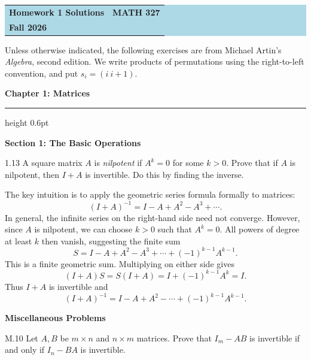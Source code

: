 \documentclass[11pt]{article}
\newcommand{\chapterheading}[1]{%
  \par\vspace{0.5em}
  {\color{courseblue}\Large\bfseries #1}\par\vspace{0.35em}
  {\color{boxborder}\hrule height 0.6pt}\vspace{0.35em}
}
\newcommand{\sectionheading}[1]{%
  \vspace{0.25em}
  {\color{darkgray}\large\bfseries #1}\par
}
\begin{document}
\begin{center}
  \colorbox{lightblue}{%
    \begin{minipage}{0.92\textwidth}
      \vspace{0.6em}
      \begin{tabular*}{\textwidth}{@{\extracolsep{\fill}}lr}
        {\color{courseblue}\bfseries\LARGE Homework 1 Solutions} &
        {\color{courseblue}\bfseries\LARGE MATH 327}\\[0.4em]
        \multicolumn{2}{l}{\color{darkgray}\bfseries Fall 2026}
      \end{tabular*}
      \vspace{0.5em}
    \end{minipage}}
\end{center}

\vspace{0.5em}

Unless otherwise indicated, the following exercises are from Michael Artin's
\emph{Algebra}, second edition.  We write products of permutations using the
right-to-left convention, and put $s_i=(i\ i+1)$.

\chapterheading{Chapter 1: Matrices}

\sectionheading{Section 1: The Basic Operations}

\begin{exercise}{1.13}
A square matrix $A$ is \emph{nilpotent} if $A^k=0$ for some $k>0$.
Prove that if $A$ is nilpotent, then $I+A$ is invertible. Do this by
finding the inverse.
\end{exercise}

\begin{solution}

The key intuition is to apply the geometric series formula formally to matrices:
\[
  (I+A)^{-1}=I-A+A^2-A^3+\cdots.
\]
In general, the infinite series on the right-hand side need not converge.
However, since $A$ is nilpotent, we can choose $k>0$ such that $A^k=0$.
All powers of degree at least $k$ then vanish, suggesting the finite sum
\[
  S=I-A+A^2-A^3+\cdots+(-1)^{k-1}A^{k-1}.
\]
This is a finite geometric sum.  Multiplying on either side gives
\[
 (I+A)S=S(I+A)=I+(-1)^{k-1}A^k=I.
\]
Thus $I+A$ is invertible and
\[
  \boxed{(I+A)^{-1}=I-A+A^2-\cdots+(-1)^{k-1}A^{k-1}}.
\]
\end{solution}

\sectionheading{Miscellaneous Problems}

\begin{exercise}{M.10}
Let $A,B$ be $m\times n$ and $n\times m$ matrices. Prove that
$I_m-AB$ is invertible if and only if $I_n-BA$ is invertible.
\end{exercise}
\end{document}
